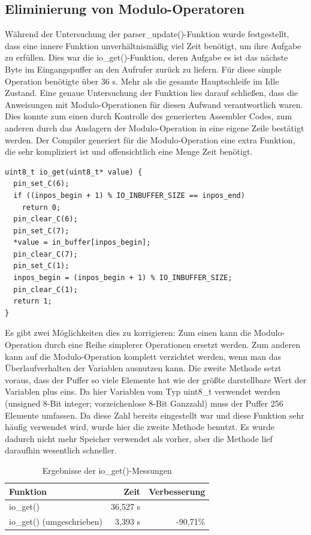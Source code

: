 \subsection{Eliminierung von Modulo-Operatoren}
Während der Untersuchung der parser\_\-update()-Funktion wurde festgestellt, dass eine innere Funktion unverhältnismäßig
viel Zeit benötigt, um ihre Aufgabe zu erfüllen. Dies war die io\_\-get()-Funktion, deren Aufgabe es ist das nächste Byte
im Eingangspuffer an den Aufrufer zurück zu liefern. Für diese simple Operation benötigte über 36 \textmu{}s. Mehr als die
gesamte Hauptschleife im Idle Zustand. Eine genaue Untersuchung der Funktion lies darauf schließen, dass die Anweisungen
mit Modulo-Operationen für diesen Aufwand verantwortlich waren. Dies konnte zum einen durch Kontrolle des generierten Assembler
Codes, zum anderen durch das Auslagern der Modulo-Operation in eine eigene Zeile bestätigt werden. Der Compiler generiert
für die Modulo-Operation eine extra Funktion, die sehr kompliziert ist und offensichtlich eine Menge Zeit benötigt.\\
\begin{verbatim}
uint8_t io_get(uint8_t* value) {
  pin_set_C(6);
  if ((inpos_begin + 1) % IO_INBUFFER_SIZE == inpos_end)
    return 0;
  pin_clear_C(6);
  pin_set_C(7);
  *value = in_buffer[inpos_begin];
  pin_clear_C(7);
  pin_set_C(1);
  inpos_begin = (inpos_begin + 1) % IO_INBUFFER_SIZE;
  pin_clear_C(1);
  return 1;
}
\end{verbatim}
Es gibt zwei Möglichkeiten dies zu korrigieren: Zum einen kann die Modulo-Operation durch eine Reihe simplerer Operationen ersetzt werden.
Zum anderen kann auf die Modulo-Operation komplett verzichtet werden, wenn man das Überlaufverhalten der Variablen ausnutzen kann.
Die zweite Methode setzt voraus, dass der Puffer so viele Elemente hat wie der größte darstellbare Wert der Variablen plus eins.
Da hier Variablen vom Typ uint8\_t verwendet werden (unsigned 8-Bit integer; vorzeichenlose 8-Bit Ganzzahl) muss der Puffer 256
Elemente umfassen. Da diese Zahl bereits eingestellt war und diese Funktion sehr häufig verwendet wird, wurde hier die zweite Methode
benutzt. Es wurde dadurch nicht mehr Speicher verwendet als vorher, aber die Methode lief daraufhin wesentlich schneller.
\begin{table}[htb]
\begin{center}
	\begin{tabular}{|l||r|r|}
		\hline
		\textbf{Funktion} & \textbf{Zeit} & \textbf{Verbesserung} \\ \hline \hline
		io\_get() & 36,527 \textmu{}s & \\ \hline
		io\_get() (umgeschrieben) & 3,393 \textmu{}s & -90,71\% \\ \hline
	\end{tabular}
	\caption{\label{io_get} Ergebnisse der io\_get()-Messungen}
\end{center}
\end{table}
